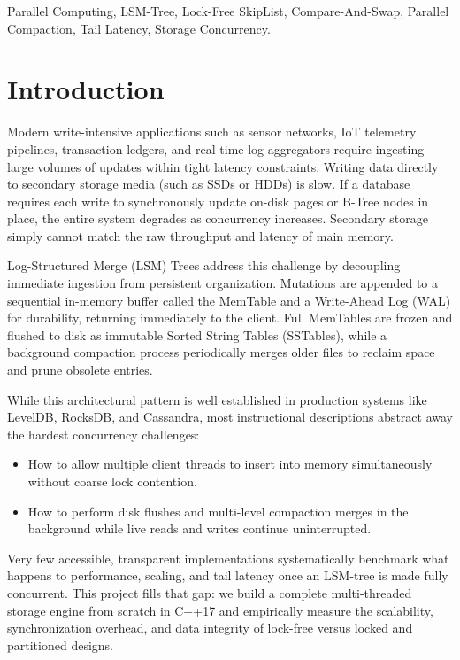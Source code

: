 \documentclass[conference]{IEEEtran}
\begin{document}
\begin{IEEEkeywords}
Parallel Computing, LSM-Tree, Lock-Free SkipList, Compare-And-Swap, Parallel Compaction, Tail Latency, Storage Concurrency.
\end{IEEEkeywords}

\section{Introduction}
Modern write-intensive applications such as sensor networks, IoT telemetry pipelines, transaction ledgers, and real-time log aggregators require ingesting large volumes of updates within tight latency constraints. Writing data directly to secondary storage media (such as SSDs or HDDs) is slow. If a database requires each write to synchronously update on-disk pages or B-Tree nodes in place, the entire system degrades as concurrency increases. Secondary storage simply cannot match the raw throughput and latency of main memory.

Log-Structured Merge (LSM) Trees address this challenge by decoupling immediate ingestion from persistent organization. Mutations are appended to a sequential in-memory buffer called the MemTable and a Write-Ahead Log (WAL) for durability, returning immediately to the client. Full MemTables are frozen and flushed to disk as immutable Sorted String Tables (SSTables), while a background compaction process periodically merges older files to reclaim space and prune obsolete entries.

While this architectural pattern is well established in production systems like LevelDB, RocksDB, and Cassandra, most instructional descriptions abstract away the hardest concurrency challenges:
\begin{itemize}
    \item How to allow multiple client threads to insert into memory simultaneously without coarse lock contention.
    \item How to perform disk flushes and multi-level compaction merges in the background while live reads and writes continue uninterrupted.
\end{itemize}
Very few accessible, transparent implementations systematically benchmark what happens to performance, scaling, and tail latency once an LSM-tree is made fully concurrent. This project fills that gap: we build a complete multi-threaded storage engine from scratch in C++17 and empirically measure the scalability, synchronization overhead, and data integrity of lock-free versus locked and partitioned designs.
\end{document}
